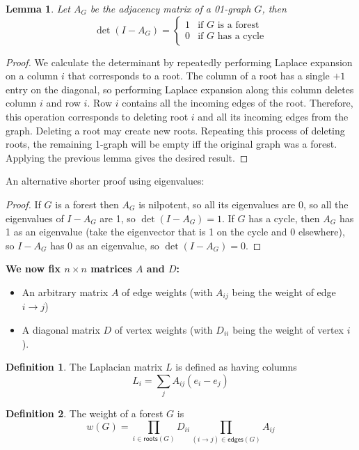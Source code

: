 \documentclass[a4paper, 11pt]{article}
\newtheorem{lemma}[theorem]{Lemma}
\theoremstyle{definition}
\newtheorem{definition}{Definition}[section]
\begin{document}
\begin{lemma}
  Let $A_G$ be the adjacency matrix of a 01-graph $G$, then
  \[
    \det(I-A_G) = \begin{cases}
      1 & \text{if $G$ is a forest}\\
      0 & \text{if $G$ has a cycle}
    \end{cases}
  \]
\end{lemma}
\begin{proof}
We calculate the determinant by repeatedly performing Laplace expansion on a column $i$ that corresponds to a root. The column of a root has a single $+1$ entry on the diagonal, so performing Laplace expansion along this column deletes column $i$ and row $i$. Row $i$ contains all the incoming edges of the root. Therefore, this operation corresponds to deleting root $i$ and all its incoming edges from the graph. Deleting a root may create new roots. Repeating this process of deleting roots, the remaining 1-graph will be empty iff the original graph was a forest. Applying the previous lemma gives the desired result.
\end{proof}

An alternative shorter proof using eigenvalues:

\begin{proof}
  If $G$ is a forest then $A_G$ is nilpotent, so all its eigenvalues are $0$, so all the eigenvalues of $I - A_G$ are 1, so $\det(I - A_G) = 1$.
  If $G$ has a cycle, then $A_G$ has 1 as an eigenvalue (take the eigenvector that is 1 on the cycle and 0 elsewhere), so $I - A_G$ has 0 as an eigenvalue, so $\det(I - A_G) = 0$.
\end{proof}

\textbf{We now fix $n\times n$ matrices $A$ and $D$:}

\begin{itemize}
  \item An arbitrary matrix $A$ of edge weights (with $A_{ij}$ being the weight of edge $i \to j$)
  \item A diagonal matrix $D$ of vertex weights (with $D_{ii}$ being the weight of vertex $i$).
\end{itemize}

\begin{definition}
  The Laplacian matrix $L$ is defined as having columns
  \[ L_i = \sum_j A_{ij}(e_i - e_j) \]
\end{definition}

\begin{definition}
  The weight of a forest $G$ is \[w(G) = \prod_{i \in \mathsf{roots}(G)} D_{ii} \prod_{(i \to j) \in \mathsf{edges}(G)} A_{ij} \]
\end{definition}
\end{document}
